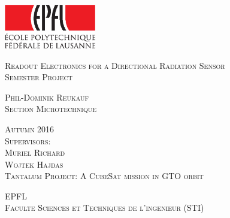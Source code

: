 


\newcommand{\Ptype}{Semester Project} %
\newcommand{\Ptitle}{Readout Electronics for a Directional Radiation Sensor}
\newcommand{\Pcand}{Phil-Dominik Reukauf}
\newcommand{\Psect}{Section Microtechnique}
\newcommand{\Pfirst}{Muriel Richard}
\newcommand{\Psecond}{Wojtek Hajdas}
\newcommand{\Pseason}{Autumn 2016} %



\begin{titlepage}

\begin{center}


\includegraphics[width=4cm]{logo_epfl_coul.eps}

\vspace*{4cm}
\Huge
\textsc{\Ptitle}\\
\vspace{0.5cm}
\vspace{0.5cm}
\normalsize
\textsc{\Ptype }\\ %
\vspace{1cm}

\large
\textsc{\Pcand\\[0.5\baselineskip] }
\normalsize
\textsc{\Psect}\\
\vspace{0.6cm}

\textsc{\Pseason}\\ %
\vspace{0.6cm}
\textsc{Supervisors:\\ \Pfirst\\ \Psecond}\\
\vspace{0.6cm}
\textsc{Tantalum Project: A CubeSat mission in GTO orbit}


\vspace{0.6cm}
\textsc{EPFL\\
Faculte Sciences et Techniques de l'ingenieur (STI)}\\

\end{center}

\end{titlepage}
